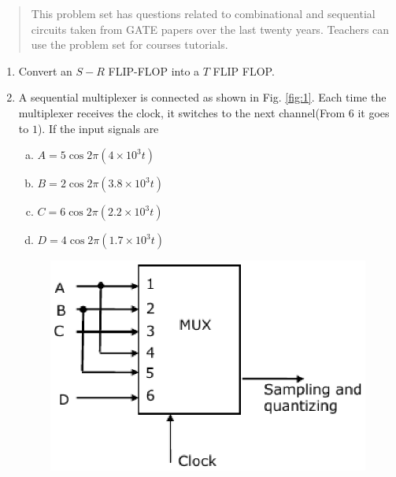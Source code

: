 \documentclass[journal,12pt,twocolumn]{IEEEtran}
\begin{document}

\bigskip

\begin{abstract}
This problem set has questions related to combinational and sequential circuits taken from GATE papers over the last twenty years.  Teachers can use the problem set for courses tutorials. 
 
\end{abstract}

\begin{enumerate}
\item Convert an $S-R$ FLIP-FLOP into a $T$ FLIP FLOP.



\item A sequential multiplexer is connected as shown in Fig. \ref{fig:1}. Each time the multiplexer receives the clock, it switches to the next channel(From $6$ it goes to $1$). If the input signals are


\begin{enumerate}[(a)]
 
\item $
A = 5 \cos 2 \pi (4 \times 10^3 t)
$

\item $
B = 2 \cos 2 \pi (3.8 \times 10^3 t)
$

\item $
C = 6 \cos 2 \pi (2.2 \times 10^3 t)
$

\item $
D = 4 \cos 2 \pi (1.7 \times 10^3 t)
$


\end{enumerate}

\begin{figure}

\centering

\includegraphics[width=\columnwidth]{./figs/1.eps}


\end{figure}
\end{enumerate}
\end{document}
